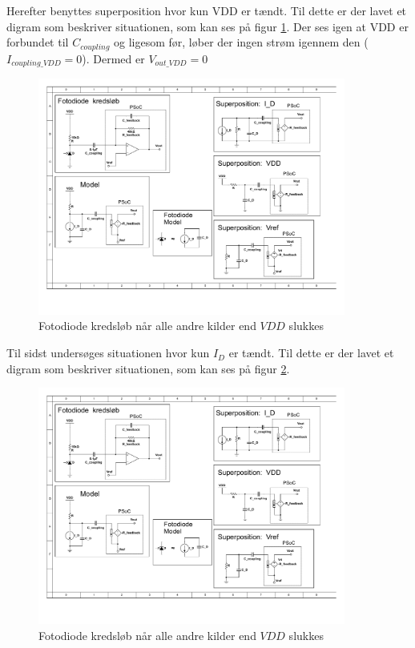 \documentclass[HardwareDesign/HardwareDesign_main.tex]{subfiles}
\begin{document}
Herefter benyttes superposition hvor kun VDD er tændt. Til dette er der lavet et digram som beskriver situationen, som kan ses på figur \ref{fig:photodiodeSPVDD}. Der ses igen at VDD er forbundet til $C_{coupling}$ og ligesom før, løber der ingen strøm igennem den ($I_{coupling\_VDD}=0$). Dermed er $V_{out\_VDD}=0$

\begin{figure}[H]
    \centering
    \includegraphics[width=0.9\textwidth,trim={6.3in 3.5in 0.8in 2.7in},clip, page=1]{HardwareDesign/CupSensor/graphics/Superposition.pdf}
    \caption{Fotodiode kredsløb når alle andre kilder end $VDD$ slukkes}
    \label{fig:photodiodeSPVDD}
\end{figure}

Til sidst undersøges situationen hvor kun $I_D$ er tændt. Til dette er der lavet et digram som beskriver situationen, som kan ses på figur \ref{fig:photodiodeSPI_D}. 

\begin{figure}[H]
    \centering
    \includegraphics[width=0.9\textwidth,trim={6.3in 5.8in 0.8in 0.6in},clip, page=1]{HardwareDesign/CupSensor/graphics/Superposition.pdf}
    \caption{Fotodiode kredsløb når alle andre kilder end $VDD$ slukkes}
    \label{fig:photodiodeSPI_D}
\end{figure}
\end{document}
